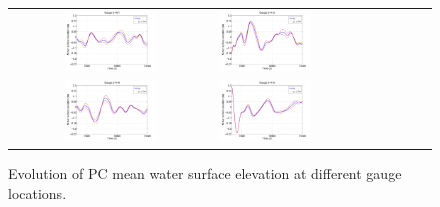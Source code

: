 \documentclass[review,12pt]{elsarticle}
\begin{document}
\begin{figure}[ht]
\begin{tabular}{clc}
        
\includegraphics[width=0.475\textwidth]{Figure7a.pdf} &
\includegraphics[width=0.475\textwidth]{Figure7b.pdf} \\
\includegraphics[width=0.475\textwidth]{Figure7c.pdf} &
\includegraphics[width=0.475\textwidth]{Figure7d.pdf}
\end{tabular}
\caption{Evolution of PC mean water surface elevation at different gauge locations.}
\label{fig:ave}
\end{figure}
\end{document}
